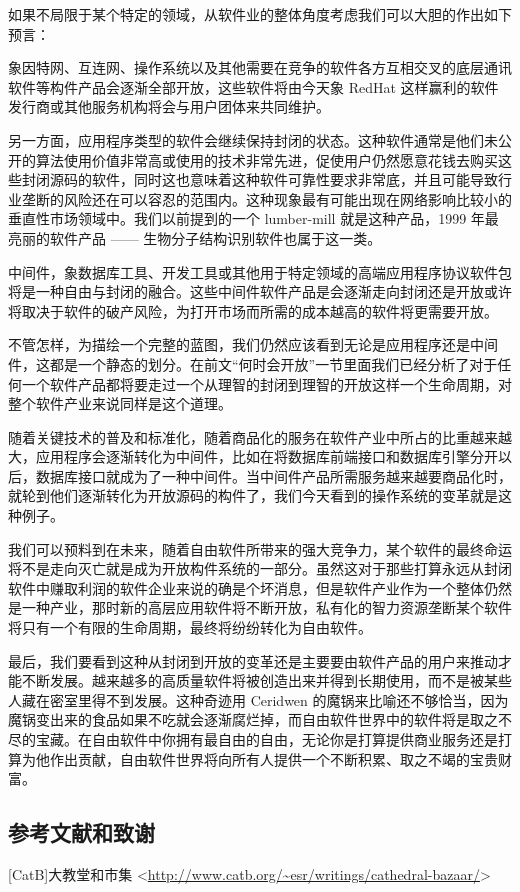 如果不局限于某个特定的领域，从软件业的整体角度考虑我们可以大胆的作出如下预言：


象因特网、互连网、操作系统以及其他需要在竞争的软件各方互相交叉的底层通讯软件等构件产品会逐渐全部开放，这些软件将由今天象 RedHat 这样赢利的软件发行商或其他服务机构将会与用户团体来共同维护。


另一方面，应用程序类型的软件会继续保持封闭的状态。这种软件通常是他们未公开的算法使用价值非常高或使用的技术非常先进，促使用户仍然愿意花钱去购买这些封闭源码的软件，同时这也意味着这种软件可靠性要求非常底，并且可能导致行业垄断的风险还在可以容忍的范围内。这种现象最有可能出现在网络影响比较小的垂直性市场领域中。我们以前提到的一个 lumber-mill 就是这种产品，1999 年最亮丽的软件产品 —— 生物分子结构识别软件也属于这一类。


中间件，象数据库工具、开发工具或其他用于特定领域的高端应用程序协议软件包将是一种自由与封闭的融合。这些中间件软件产品是会逐渐走向封闭还是开放或许将取决于软件的破产风险，为打开市场而所需的成本越高的软件将更需要开放。


不管怎样，为描绘一个完整的蓝图，我们仍然应该看到无论是应用程序还是中间件，这都是一个静态的划分。在前文“何时会开放”一节里面我们已经分析了对于任何一个软件产品都将要走过一个从理智的封闭到理智的开放这样一个生命周期，对整个软件产业来说同样是这个道理。


随着关键技术的普及和标准化，随着商品化的服务在软件产业中所占的比重越来越大，应用程序会逐渐转化为中间件，比如在将数据库前端接口和数据库引擎分开以后，数据库接口就成为了一种中间件。当中间件产品所需服务越来越要商品化时，就轮到他们逐渐转化为开放源码的构件了，我们今天看到的操作系统的变革就是这种例子。


我们可以预料到在未来，随着自由软件所带来的强大竞争力，某个软件的最终命运将不是走向灭亡就是成为开放构件系统的一部分。虽然这对于那些打算永远从封闭软件中赚取利润的软件企业来说的确是个坏消息，但是软件产业作为一个整体仍然是一种产业，那时新的高层应用软件将不断开放，私有化的智力资源垄断某个软件将只有一个有限的生命周期，最终将纷纷转化为自由软件。


最后，我们要看到这种从封闭到开放的变革还是主要要由软件产品的用户来推动才能不断发展。越来越多的高质量软件将被创造出来并得到长期使用，而不是被某些人藏在密室里得不到发展。这种奇迹用 Ceridwen 的魔锅来比喻还不够恰当，因为魔锅变出来的食品如果不吃就会逐渐腐烂掉，而自由软件世界中的软件将是取之不尽的宝藏。在自由软件中你拥有最自由的自由，无论你是打算提供商业服务还是打算为他作出贡献，自由软件世界将向所有人提供一个不断积累、取之不竭的宝贵财富。

\subsection{参考文献和致谢}
[CatB]大教堂和市集 <\url{http://www.catb.org/~esr/writings/cathedral-bazaar/}>


